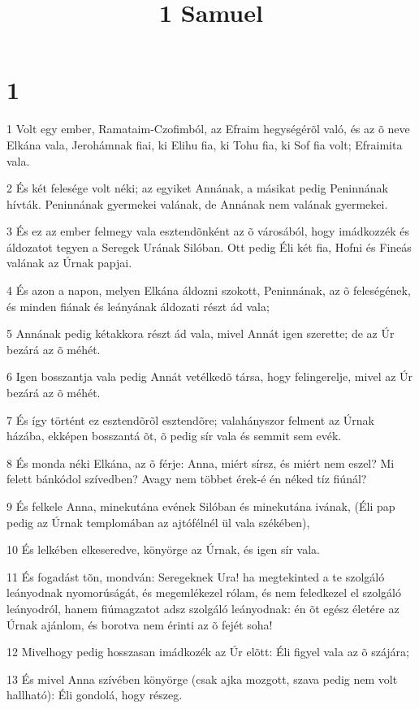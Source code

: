 

\title{1 Samuel}


\chapter{1}

\par 1 Volt egy ember, Ramataim-Czofimból, az Efraim hegységérõl való, és az õ neve Elkána vala, Jerohámnak fiai, ki Elihu fia, ki Tohu fia, ki Sof fia volt; Efraimita vala.
\par 2 És két felesége volt néki; az egyiket Annának, a másikat pedig Peninnának hívták. Peninnának gyermekei valának, de Annának nem valának gyermekei.
\par 3 És ez az ember felmegy vala esztendõnként az õ városából, hogy imádkozzék és áldozatot tegyen a Seregek Urának Silóban. Ott pedig Éli két fia, Hofni és Fineás valának az Úrnak papjai.
\par 4 És azon a napon, melyen Elkána áldozni szokott, Peninnának, az õ feleségének, és minden fiának és leányának áldozati részt ád vala;
\par 5 Annának pedig kétakkora részt ád vala, mivel Annát igen szerette; de az Úr bezárá az õ méhét.
\par 6 Igen bosszantja vala pedig Annát vetélkedõ társa, hogy felingerelje, mivel az Úr bezárá az õ méhét.
\par 7 És így történt ez esztendõrõl esztendõre; valahányszor felment az Úrnak házába, ekképen bosszantá õt, õ pedig sír vala és semmit sem evék.
\par 8 És monda néki Elkána, az õ férje: Anna, miért sírsz, és miért nem eszel? Mi felett bánkódol szívedben? Avagy nem többet érek-é én néked tíz fiúnál?
\par 9 És felkele Anna, minekutána evének Silóban és minekutána ivának, (Éli pap pedig az Úrnak templomában az ajtófélnél ül vala székében),
\par 10 És lelkében elkeseredve, könyörge az Úrnak, és igen sír vala.
\par 11 És fogadást tõn, mondván: Seregeknek Ura! ha megtekinted a te szolgáló leányodnak nyomorúságát, és megemlékezel rólam, és nem feledkezel el szolgáló leányodról, hanem fiúmagzatot adsz szolgáló leányodnak: én õt egész életére az Úrnak ajánlom, és borotva nem érinti az õ fejét soha!
\par 12 Mivelhogy pedig hosszasan imádkozék az Úr elõtt: Éli figyel vala az õ szájára;
\par 13 És mivel Anna szívében könyörge (csak ajka mozgott, szava pedig nem volt hallható): Éli gondolá, hogy részeg.
